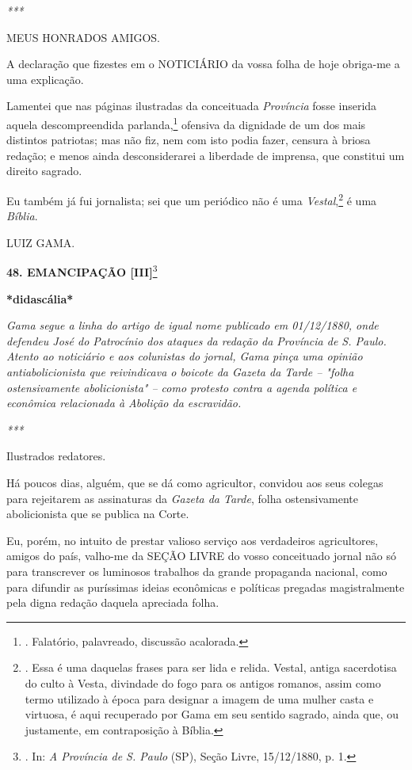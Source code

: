 \emph{***}

MEUS HONRADOS AMIGOS.

A declaração que fizestes em o NOTICIÁRIO da vossa folha de hoje
obriga-me a uma explicação.

Lamentei que nas páginas ilustradas da conceituada \emph{Província}
fosse inserida aquela descompreendida parlanda,\footnote{. Falatório,
  palavreado, discussão acalorada.} ofensiva da dignidade de um dos mais
distintos patriotas; mas não fiz, nem com isto podia fazer, censura à
briosa redação; e menos ainda desconsiderarei a liberdade de imprensa,
que constitui um direito sagrado.

Eu também já fui jornalista; sei que um periódico não é uma
\emph{Vestal},\footnote{. Essa é uma daquelas frases para ser lida e
  relida. Vestal, antiga sacerdotisa do culto à Vesta, divindade do fogo
  para os antigos romanos, assim como termo utilizado à época para
  designar a imagem de uma mulher casta e virtuosa, é aqui recuperado
  por Gama em seu sentido sagrado, ainda que, ou justamente, em
  contraposição à Bíblia.} é uma \emph{Bíblia}.

LUIZ GAMA.

\textbf{48. EMANCIPAÇÃO {[}III{]}}\footnote{. In: \emph{A Província de
  S. Paulo} (SP), Seção Livre, 15/12/1880, p. 1.}

\textbf{*}\textbf{didascália*}

\emph{Gama segue a linha do artigo de igual nome publicado em
01/12/1880, onde defendeu José do Patrocínio dos ataques da redação da
Província de S. Paulo. Atento ao noticiário e aos colunistas do jornal,
Gama pinça uma opinião antiabolicionista que reivindicava o boicote da
Gazeta da Tarde -- "folha ostensivamente abolicionista" -- como protesto
contra a agenda política e econômica relacionada à Abolição da
escravidão. }

\emph{***}

Ilustrados redatores.

Há poucos dias, alguém, que se dá como agricultor, convidou aos seus
colegas para rejeitarem as assinaturas da \emph{Gazeta da Tarde}, folha
ostensivamente abolicionista que se publica na Corte.

Eu, porém, no intuito de prestar valioso serviço aos verdadeiros
agricultores, amigos do país, valho-me da SEÇÃO LIVRE do vosso
conceituado jornal não só para transcrever os luminosos trabalhos da
grande propaganda nacional, como para difundir as puríssimas ideias
econômicas e políticas pregadas magistralmente pela digna redação
daquela apreciada folha.

